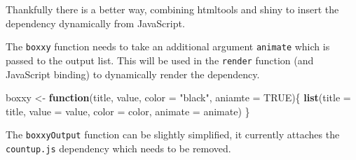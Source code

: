 \documentclass[
]{krantz}
\makeatletter
\newenvironment{Shaded}{\begin{snugshade}}{\end{snugshade}}
\newcommand{\CommentTok}[1]{\textcolor[rgb]{0.37,0.37,0.37}{\textit{#1}}}
\newcommand{\ControlFlowTok}[1]{\textcolor[rgb]{0.27,0.27,0.27}{\textbf{#1}}}
\newcommand{\DataTypeTok}[1]{\textcolor[rgb]{0.27,0.27,0.27}{#1}}
\newcommand{\KeywordTok}[1]{\textcolor[rgb]{0.27,0.27,0.27}{\textbf{#1}}}
\newcommand{\NormalTok}[1]{#1}
\newcommand{\OperatorTok}[1]{\textcolor[rgb]{0.43,0.43,0.43}{\textbf{#1}}}
\newcommand{\OtherTok}[1]{\textcolor[rgb]{0.37,0.37,0.37}{#1}}
\newcommand{\StringTok}[1]{\textcolor[rgb]{0.5,0.5,0.5}{#1}}
\newenvironment{kframe}{%
\medskip{}
\setlength{\fboxsep}{.8em}
 \def\at@end@of@kframe{}%
 \ifinner\ifhmode%
  \def\at@end@of@kframe{\end{minipage}}%
  \begin{minipage}{\columnwidth}%
 \fi\fi%
 \def\FrameCommand##1{\hskip\@totalleftmargin \hskip-\fboxsep
 \colorbox{shadecolor}{##1}\hskip-\fboxsep
     \hskip-\linewidth \hskip-\@totalleftmargin \hskip\columnwidth}%
 \MakeFramed {\advance\hsize-\width
   \@totalleftmargin\z@ \linewidth\hsize
   \@setminipage}}%
 {\par\unskip\endMakeFramed%
 \at@end@of@kframe}
\renewenvironment{Shaded}{\begin{kframe}}{\end{kframe}}
\makeatother
\begin{document}
Thankfully there is a better way, combining htmltools and shiny to insert the dependency dynamically from JavaScript.

The \texttt{boxxy} function needs to take an additional argument \texttt{animate} which is passed to the output list. This will be used in the \texttt{render} function (and JavaScript binding) to dynamically render the dependency.

\begin{Shaded}
\begin{Highlighting}[]
\NormalTok{boxxy <{-}}\StringTok{ }\ControlFlowTok{function}\NormalTok{(title, value, }\DataTypeTok{color =} \StringTok{"black"}\NormalTok{, }\DataTypeTok{aniamte =} \OtherTok{TRUE}\NormalTok{)\{}
  \KeywordTok{list}\NormalTok{(}\DataTypeTok{title =}\NormalTok{ title, }\DataTypeTok{value =}\NormalTok{ value, }\DataTypeTok{color =}\NormalTok{ color, }\DataTypeTok{animate =}\NormalTok{ animate)}
\NormalTok{\}}
\end{Highlighting}
\end{Shaded}

The \texttt{boxxyOutput} function can be slightly simplified, it currently attaches the \texttt{countup.js} dependency which needs to be removed.

\begin{Shaded}
\end{Shaded}
\end{document}
